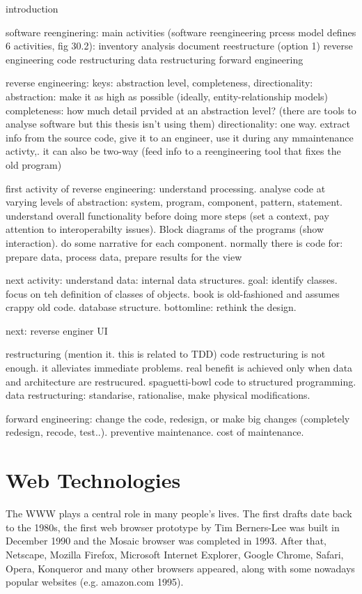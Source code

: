 introduction

software reenginering:
main activities (software reengineering prcess model defines 6 activities, fig 30.2):
inventory analysis
document reestructure (option 1)
reverse engineering
code restructuring
data restructuring
forward engineering

reverse engineering:
keys: abstraction level, completeness, directionality:
abstraction: make it as high as possible (ideally, entity-relationship models)
completeness: how much detail prvided at an abstraction level?
(there are tools to analyse software but this thesis isn't using them)
directionality: one way. extract info from the source code, give it to an engineer, use it during any mmaintenance activty,. it can also be two-way (feed info to a reengineering tool that fixes the old program)

first activity of reverse engineering: understand processing. analyse code at varying levels of abstraction: system, program, component, pattern, statement. 
understand overall functionality before doing more steps (set a context, pay attention to interoperabilty issues). Block diagrams of the programs (show interaction). do some narrative for each component.
normally there is code for: prepare data, process data, prepare results for the view

next activity: understand data:
internal data structures. goal: identify classes. focus on teh definition of classes of objects. book is old-fashioned and assumes crappy old code.
database structure. bottomline: rethink the design.

next: reverse enginer UI

restructuring
(mention it. this is related to TDD)
code restructuring is not enough. it alleviates immediate problems. real benefit is achieved only when data and architecture are restrucured. spaguetti-bowl code to structured programming.
data restructuring: standarise, rationalise, make physical modifications.

forward engineering: change the code, redesign, or make big changes (completely redesign, recode, test..). preventive maintenance. cost of maintenance.


\section{Web Technologies}
The \ac{WWW} plays a central role in many people's lives.
The first drafts date back to the 1980s, the first web browser prototype by Tim Berners-Lee was built in December 1990 and the Mosaic browser was completed in 1993.
After that, Netscape, Mozilla Firefox, Microsoft Internet Explorer, Google Chrome, Safari, Opera, Konqueror and many other browsers appeared, along with some nowadays popular websites (e.g. amazon.com 1995).

